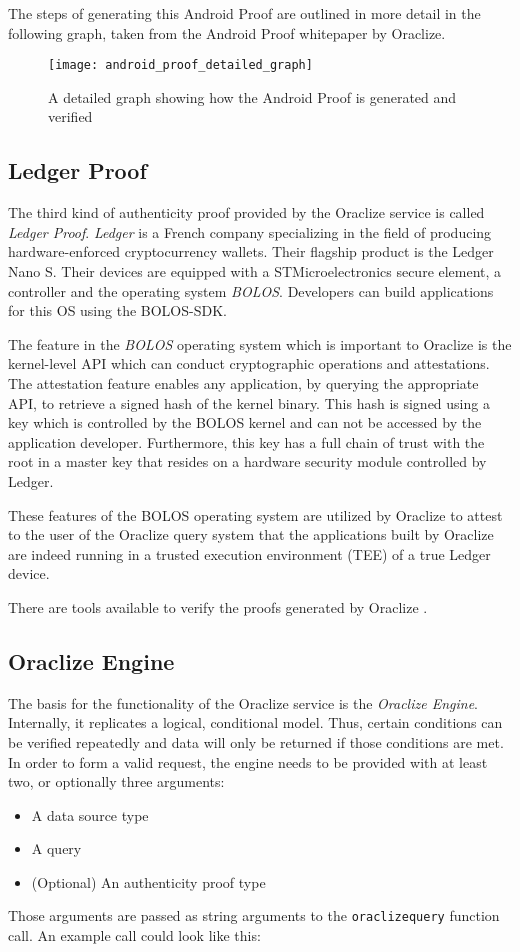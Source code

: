 The steps of generating this Android Proof are outlined in more detail in the following graph, taken from the Android Proof whitepaper by Oraclize.

\begin{figure}[H]
\centering
\texttt{[image: android\_proof\_detailed\_graph]}
\caption{A detailed graph showing how the Android Proof is generated and verified\cite{androidproof}}
\end{figure}
\subsection*{Ledger Proof}
The third kind of authenticity proof provided by the Oraclize service is called \emph{Ledger Proof}. \emph{Ledger} is a French company specializing in the field of producing hardware-enforced cryptocurrency wallets. Their flagship product is the Ledger Nano S. Their devices are equipped with a STMicroelectronics secure element, a controller and the operating system \emph{BOLOS}. Developers can build applications for this OS using the BOLOS-SDK.

The feature in the \emph{BOLOS} operating system which is important to Oraclize is the kernel-level API which can conduct cryptographic operations and attestations. The attestation feature enables any application, by querying the appropriate API, to retrieve a signed hash of the kernel binary. This hash is signed using a key which is controlled by the BOLOS kernel and can not be accessed by the application developer. Furthermore, this key has a full chain of trust with the root in a master key that resides on a hardware security module controlled by Ledger.

These features of the BOLOS operating system are utilized by Oraclize to attest to the user of the Oraclize query system that the applications built by Oraclize are indeed running in a trusted execution environment (TEE) of a true Ledger device\cite{oraclizedoc}.


There are tools available to verify the proofs generated by Oraclize \cite{oraclizeproofverify}.
\subsection*{Oraclize Engine}
The basis for the functionality of the Oraclize service is the \emph{Oraclize Engine}. Internally, it replicates a logical, conditional model. Thus, certain conditions can be verified repeatedly and data will only be returned if those conditions are met. In order to form a valid request, the engine needs to be provided with at least two, or optionally three arguments:
\begin{itemize}
	\item A data source type
	\item A query
	\item (Optional) An authenticity proof type
\end{itemize} 
Those arguments are passed as string arguments to the \texttt{oraclize\textunderscore query} function call. An example call could look like this:

